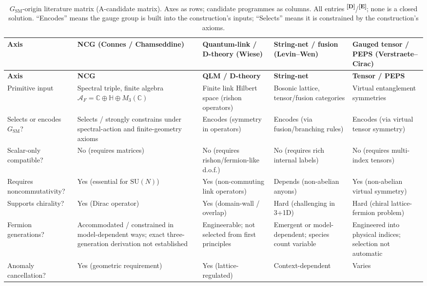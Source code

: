 \documentclass[12pt,a4paper,twoside]{article}
\theoremstyle{plain}
\theoremstyle{definition}
\theoremstyle{remark}
\newcommand{\catmark}[1]{\textsuperscript{\textsf{\textbf{[#1]}}}}
\begin{document}
{\scriptsize
\renewcommand{\arraystretch}{1.25}
\begin{longtable}{p{} p{} p{} p{} p{}}
\caption{$G_{\mathrm{SM}}$-origin literature matrix (A-candidate matrix).
Axes as rows; candidate programmes as columns. All entries \catmark{D}/\catmark{E};
none is a closed solution. ``Encodes'' means the gauge group is built into the
construction's inputs; ``Selects'' means it is constrained by the construction's
axioms.}
\label{tab:literature-matrix}\\
\toprule
\textbf{Axis} & \textbf{NCG (Connes / Chamseddine)} & \textbf{Quantum-link / D-theory (Wiese)} & \textbf{String-net / fusion (Levin--Wen)} & \textbf{Gauged tensor / PEPS (Verstraete--Cirac)} \\
\midrule
\endfirsthead
\toprule
\textbf{Axis} & \textbf{NCG} & \textbf{QLM / D-theory} & \textbf{String-net} & \textbf{Tensor / PEPS} \\
\midrule
\endhead
\bottomrule
\endfoot
Primitive input & Spectral triple, finite algebra $\mathcal{A}_F = \mathbb{C}\oplus\mathbb{H}\oplus M_3(\mathbb{C})$ & Finite link Hilbert space (rishon operators) & Bosonic lattice, tensor/fusion categories & Virtual entanglement symmetries \\
Selects or encodes $G_{\mathrm{SM}}$? & Selects / strongly constrains under spectral-action and finite-geometry axioms & Encodes (symmetry in operators) & Encodes (via fusion/branching rules) & Encodes (via virtual tensor symmetry) \\
Scalar-only compatible? & No (requires matrices) & No (requires rishon/fermion-like d.o.f.) & No (requires rich internal labels) & No (requires multi-index tensors) \\
Requires noncommutativity? & Yes (essential for $\mathrm{SU}(N)$) & Yes (non-commuting link operators) & Depends (non-abelian anyons) & Yes (non-abelian virtual symmetry) \\
Supports chirality? & Yes (Dirac operator) & Yes (domain-wall / overlap) & Hard (challenging in 3+1D) & Hard (chiral lattice-fermion problem) \\
Fermion generations? & Accommodated / constrained in model-dependent ways; exact three-generation derivation not established & Engineerable; not selected from first principles & Emergent or model-dependent; species count variable & Engineered into physical indices; selection not automatic \\
Anomaly cancellation? & Yes (geometric requirement) & Yes (lattice-regulated) & Context-dependent & Varies \\

\end{longtable}}
\end{document}

